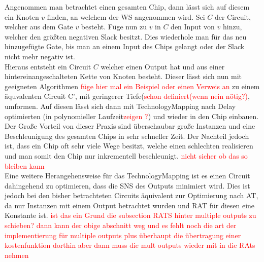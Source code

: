 \documentclass[11pt, a4paper, german]{article}
\newcommand{\TM}{TechnologyMapping }
\begin{document}
Angenommen man betrachtet einen gesamten Chip, dann lässt sich auf diesem ein Knoten $v$ finden, an welchem der WS angenommen wird. Sei $C$ der Circuit, welcher aus dem Gate $v$ besteht. Füge nun zu $v$ in $C$ den Input von $v$ hinzu, welcher den größten negativen Slack besitzt. Dies wiederhole man für das neu hinzugefügte Gate, bis man an einem Input des Chips gelangt oder der Slack nicht mehr negativ ist. \\
Hieraus entsteht ein Circuit $C$ welcher einen Output hat und aus einer hintereinangeschalteten Kette von Knoten besteht. Dieser lässt sich nun mit geeigneten Algorithmen \textcolor{red}{füge hier mal ein Beispiel oder einen Verweis an} zu einem äquvalenten Circuit C', mit geringerer Tiefe(\textcolor{red}{schon definiert(wenn nein nötig?)}, umformen. Auf diesen lässt sich dann mit  \TM nach Delay optimierten (in polynomieller Laufzeit\textcolor{red}{zeigen ?}) und wieder in den Chip einbauen. Der Große Vorteil von dieser Praxis sind überschaubar große Instanzen und eine Beschleunigung des gesamten Chips in sehr schneller Zeit. Der Nachteil jedoch ist, dass ein Chip oft sehr viele Wege besitzt, welche einen schlechten realisieren und man somit den Chip nur inkrementell beschleunigt. \textcolor{red}{nicht sicher ob das so bleiben kann}\\

Eine weitere Herangehensweise für das \TM ist es einen Circuit dahingehend zu optimieren, dass die SNS des Outputs minimiert wird. Dies ist jedoch bei den bisher betrachteten Circuits äquivalent zur Optimierung nach AT, da nur Instanzen mit einem Output betrachtet wurden und RAT für diesen eine Konstante ist.
\textcolor{red}{ist das ein Grund die subsection RATS hinter multiple outputs zu schieben? dann kann der obige abschnitt weg und es fehlt noch die art der implementierung für multiple outputs plus überhaupt die übertragung einer kostenfunktion dorthin aber dann muss die mult outputs wieder mit in die RAts nehmen}
\end{document}
